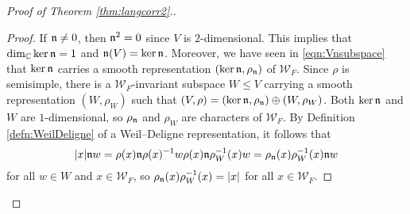 \begin{proof}[Proof of Theorem \ref{thm:langcorr2}.]
\begin{lemma}
    \end{lemma}
    \begin{proof}
        If $\mathfrak{n}\neq 0$, then $\mathfrak{n}^2=0$ since $V$ is $2$-dimensional. This implies that $\dim_{\mathbb{C}}\ker\mathfrak{n}=1$ and $\mathfrak{n}(V)=\ker\mathfrak{n}$. Moreover, we have seen in \eqref{eqn:Vnsubspace} that $\ker\mathfrak{n}$ carries a smooth representation $(\ker\mathfrak{n},\rho_{\mathfrak{n}})$ of $\mathcal{W}_F$. Since $\rho$ is semisimple, there is a $\mathcal{W}_F$-invariant subspace $W\leq V$ carrying a smooth representation $(W,\rho_W)$ such that $(V,\rho)=(\ker\mathfrak{n},\rho_{\mathfrak{n}})\oplus(W,\rho_W)$. Both $\ker\mathfrak{n}$ and $W$ are $1$-dimensional, so $\rho_{\mathfrak{n}}$ and $\rho_W$ are characters of $\mathcal{W}_F$. By Definition \ref{defn:WeilDeligne} of a Weil--Deligne representation, it follows that
        $$|x|\mathfrak{n} w=\rho(x)\mathfrak{n}\rho(x)^{-1}w\rho(x)\mathfrak{n}\rho_W^{-1}(x)w=\rho_{\mathfrak{n}}(x)\rho_W^{-1}(x)\mathfrak{n} w$$
        for all $w\in W$ and $x\in\mathcal{W}_F$, so $\rho_{\mathfrak{n}}(x)\rho_W^{-1}(x)=|x|$ for all $x\in\mathcal{W}_F$.


\end{proof}
\end{proof}
